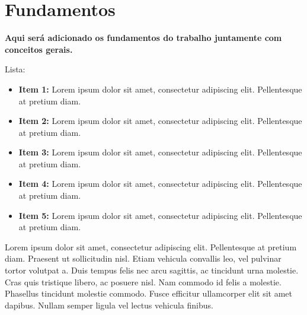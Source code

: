 \section{Fundamentos}
\textbf{Aqui será adicionado os fundamentos do trabalho juntamente com conceitos gerais.}

Lista:
\begin{itemize}
\item \textbf{Item 1:} Lorem ipsum dolor sit amet, consectetur adipiscing elit. Pellentesque at pretium diam. 
\item \textbf{Item 2:} Lorem ipsum dolor sit amet, consectetur adipiscing elit. Pellentesque at pretium diam.
\item \textbf{Item 3:} Lorem ipsum dolor sit amet, consectetur adipiscing elit. Pellentesque at pretium diam.
\item \textbf{Item 4:} Lorem ipsum dolor sit amet, consectetur adipiscing elit. Pellentesque at pretium diam.
\item \textbf{Item 5:} Lorem ipsum dolor sit amet, consectetur adipiscing elit. Pellentesque at pretium diam.
\end{itemize}

Lorem ipsum dolor sit amet, consectetur adipiscing elit. Pellentesque at pretium
diam. Praesent ut sollicitudin nisl. Etiam vehicula convallis leo, vel pulvinar tortor
volutpat a. Duis tempus felis nec arcu sagittis, ac tincidunt urna molestie. Cras quis
tristique libero, ac posuere nisl. Nam commodo id felis a molestie. Phasellus tincidunt
molestie commodo. Fusce efficitur ullamcorper elit sit amet dapibus. Nullam semper
ligula vel lectus vehicula finibus.